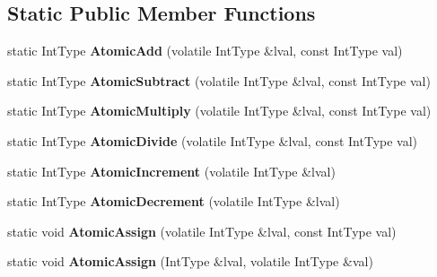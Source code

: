 \subsection*{Static Public Member Functions}
\begin{DoxyCompactItemize}
\item 
\hypertarget{classLoki_1_1SingleThreaded_a2f4d223fc3013294c8b0d1ac746e27b7}{}static Int\+Type {\bfseries Atomic\+Add} (volatile Int\+Type \&lval, const Int\+Type val)\label{classLoki_1_1SingleThreaded_a2f4d223fc3013294c8b0d1ac746e27b7}

\item 
\hypertarget{classLoki_1_1SingleThreaded_a5e7eb530884313229565101643733e96}{}static Int\+Type {\bfseries Atomic\+Subtract} (volatile Int\+Type \&lval, const Int\+Type val)\label{classLoki_1_1SingleThreaded_a5e7eb530884313229565101643733e96}

\item 
\hypertarget{classLoki_1_1SingleThreaded_afc217706217ff854165b63c9ed8c46d5}{}static Int\+Type {\bfseries Atomic\+Multiply} (volatile Int\+Type \&lval, const Int\+Type val)\label{classLoki_1_1SingleThreaded_afc217706217ff854165b63c9ed8c46d5}

\item 
\hypertarget{classLoki_1_1SingleThreaded_a7d7e90829b419571b85aa782d9acaa76}{}static Int\+Type {\bfseries Atomic\+Divide} (volatile Int\+Type \&lval, const Int\+Type val)\label{classLoki_1_1SingleThreaded_a7d7e90829b419571b85aa782d9acaa76}

\item 
\hypertarget{classLoki_1_1SingleThreaded_a98929acf64576693c065c1d9560bd40b}{}static Int\+Type {\bfseries Atomic\+Increment} (volatile Int\+Type \&lval)\label{classLoki_1_1SingleThreaded_a98929acf64576693c065c1d9560bd40b}

\item 
\hypertarget{classLoki_1_1SingleThreaded_aef003bc717978b34a62cdc35b6465924}{}static Int\+Type {\bfseries Atomic\+Decrement} (volatile Int\+Type \&lval)\label{classLoki_1_1SingleThreaded_aef003bc717978b34a62cdc35b6465924}

\item 
\hypertarget{classLoki_1_1SingleThreaded_a8997e0ddd9161112a3654ed9b3b444a6}{}static void {\bfseries Atomic\+Assign} (volatile Int\+Type \&lval, const Int\+Type val)\label{classLoki_1_1SingleThreaded_a8997e0ddd9161112a3654ed9b3b444a6}

\item 
\hypertarget{classLoki_1_1SingleThreaded_af120eb3c0bb68384d1072b26026a1aec}{}static void {\bfseries Atomic\+Assign} (Int\+Type \&lval, volatile Int\+Type \&val)\label{classLoki_1_1SingleThreaded_af120eb3c0bb68384d1072b26026a1aec}


\end{DoxyCompactItemize}
